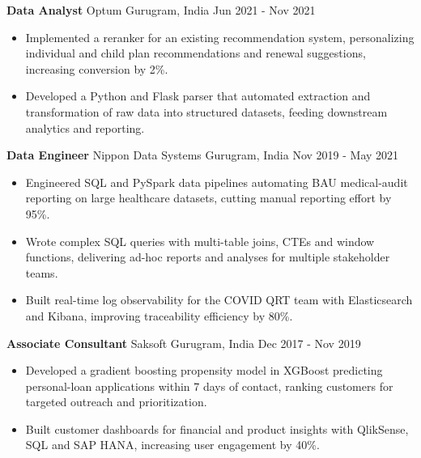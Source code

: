 \documentclass[10pt,a4paper]{article}
\newcommand{\role}[4]{\textbf{#1} \textbar{} #2 \hfill #3 \textbar{} #4\par}
\begin{document}
\vspace{3pt}
\role{Data Analyst}{Optum}{Gurugram, India}{Jun 2021 - Nov 2021}
\begin{itemize}
  \item Implemented a reranker for an existing recommendation system, personalizing individual and child plan recommendations and renewal suggestions, increasing conversion by 2\%.
  \item Developed a Python and Flask parser that automated extraction and transformation of raw data into structured datasets, feeding downstream analytics and reporting.
\end{itemize}
\vspace{3pt}
\role{Data Engineer}{Nippon Data Systems}{Gurugram, India}{Nov 2019 - May 2021}
\begin{itemize}
  \item Engineered SQL and PySpark data pipelines automating BAU medical-audit reporting on large healthcare datasets, cutting manual reporting effort by 95\%.
  \item Wrote complex SQL queries with multi-table joins, CTEs and window functions, delivering ad-hoc reports and analyses for multiple stakeholder teams.
  \item Built real-time log observability for the COVID QRT team with Elasticsearch and Kibana, improving traceability efficiency by 80\%.
\end{itemize}
\vspace{3pt}
\role{Associate Consultant}{Saksoft}{Gurugram, India}{Dec 2017 - Nov 2019}
\begin{itemize}
  \item Developed a gradient boosting propensity model in XGBoost predicting personal-loan applications within 7 days of contact, ranking customers for targeted outreach and prioritization.
  \item Built customer dashboards for financial and product insights with QlikSense, SQL and SAP HANA, increasing user engagement by 40\%.
\end{itemize}
\end{document}
